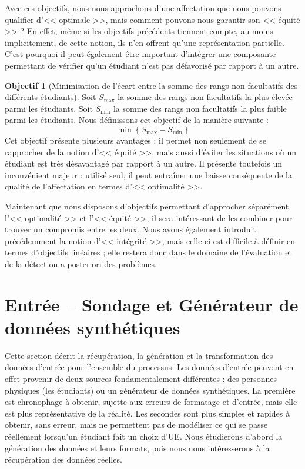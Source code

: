 \documentclass{rapport}
\theoremstyle{definition}
\theoremstyle{remark}
\theoremstyle{plain}
\theoremstyle{definition}
\theoremstyle{definition}
\newtheorem*{goal}{Objectif}
\theoremstyle{remark}
\theoremstyle{definition}
\begin{document}
Avec ces objectifs, nous nous approchons d'une affectation que nous pouvons qualifier d'<< optimale >>, mais comment pouvons-nous garantir son << équité >> ? En effet, même si les objectifs précédents tiennent compte, au moins implicitement, de cette notion, ils n'en offrent qu'une représentation partielle.
C'est pourquoi il peut également être important d'intégrer une composante permettant de vérifier qu'un étudiant n'est pas défavorisé par rapport à un autre.
\begin{goal}[Minimisation de l'écart entre la somme des rangs non facultatifs des différents étudiants]
    Soit $S_{\max}$ la somme des rangs non facultatifs la plus élevée parmi les étudiants. Soit $S_{\min}$ la somme des rangs non facultatifs la plus faible parmi les étudiants.
    Nous définissons cet objectif de la manière suivante :
    $$
        \min\left\{S_{\max}-S_{\min}\right\}
    $$
    Cet objectif présente plusieurs avantages : il permet non seulement de se rapprocher de la notion d'<< équité >>, mais aussi d'éviter les situations où un étudiant est très désavantagé par rapport à un autre.
    Il présente toutefois un inconvénient majeur : utilisé seul, il peut entraîner une baisse conséquente de la qualité de l'affectation en termes d'<< optimalité >>.
\end{goal}

Maintenant que nous disposons d'objectifs permettant d'approcher séparément l'<< optimalité >> et l'<< équité >>, il sera intéressant de les combiner pour trouver un compromis entre les deux.
Nous avons également introduit précédemment la notion d'<< intégrité >>, mais celle-ci est difficile à définir en termes d'objectifs linéaires ; elle restera donc dans le domaine de l'évaluation et de la détection a posteriori des problèmes.

\section{Entrée -- Sondage et Générateur de données synthétiques}
Cette section décrit la récupération, la génération et la transformation des données d'entrée pour l'ensemble du processus.
Les données d'entrée peuvent en effet provenir de deux sources fondamentalement différentes : des personnes physiques (les étudiants) ou un générateur de données synthétiques.
La première est chronophage à obtenir, sujette aux erreurs de formatage et d'entrée, mais elle est plus représentative de la réalité. Les secondes sont plus simples et rapides à obtenir, sans erreur, mais ne permettent pas de modéliser ce qui se passe réellement lorsqu'un étudiant fait un choix d'UE.
Nous étudierons d'abord la génération des données et leurs formats, puis nous nous intéresserons à la récupération des données réelles.
\end{document}
